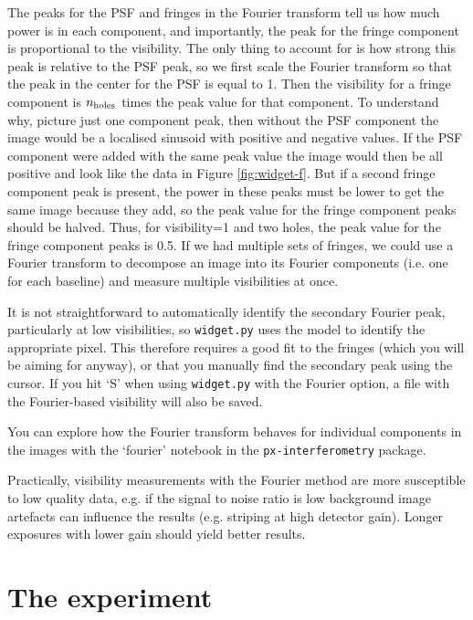 \documentclass[11pt]{article}
\begin{document}
The peaks for the PSF and fringes in the Fourier transform tell us how much power is in each component, and importantly, the peak for the fringe component is proportional to the visibility. The only thing to account for is how strong this peak is relative to the PSF peak, so we first scale the Fourier transform so that the peak in the center for the PSF is equal to 1. Then the visibility for a fringe component is $n_{\rm holes}$ times the peak value for that component. To understand why, picture just one component peak, then without the PSF component the image would be a localised sinusoid with positive and negative values. If the PSF component were added with the same peak value the image would then be all positive and look like the data in Figure \ref{fig:widget-f}. But if a second fringe component peak is present, the power in these peaks must be lower to get the same image because they add, so the peak value for the fringe component peaks should be halved. Thus, for visibility=1 and two holes, the peak value for the fringe component peaks is 0.5. If we had multiple sets of fringes, we could use a Fourier transform to decompose an image into its Fourier components (i.e. one for each baseline) and measure multiple visibilities at once.

It is not straightforward to automatically identify the secondary Fourier peak, particularly at low visibilities, so \texttt{widget.py} uses the model to identify the appropriate pixel. This therefore requires a good fit to the fringes (which you will be aiming for anyway), or that you manually find the secondary peak using the cursor. If you hit `S' when using \texttt{widget.py} with the Fourier option, a file with the Fourier-based visibility will also be saved.

You can explore how the Fourier transform behaves for individual components in the images with the `fourier' notebook in the \texttt{px-interferometry} package.

Practically, visibility measurements with the Fourier method are more susceptible to low quality data, e.g. if the signal to noise ratio is low background image artefacts can influence the results (e.g. striping at high detector gain). Longer exposures with lower gain should yield better results.

\clearpage
\section{The experiment}
\end{document}
